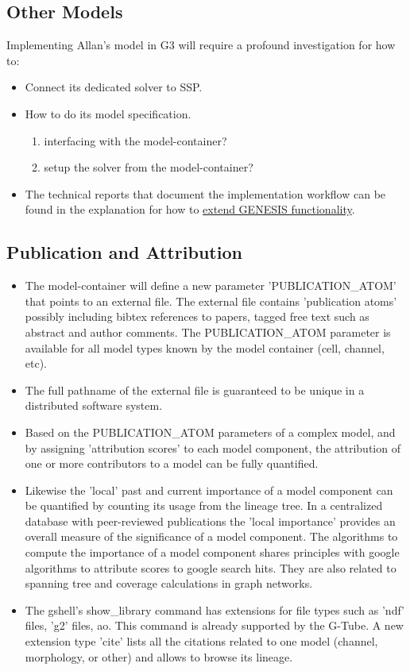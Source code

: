 \documentclass[12pt]{article}
\begin{document}
\subsection{Other Models}

Implementing Allan's model in G3 will require a profound investigation
for how to:
\begin{itemize}
\item Connect its dedicated solver to SSP.
\item How to do its model specification.
  \begin{enumerate}
  \item interfacing with the model-container?
  \item setup the solver from the model-container?
  \end{enumerate}
\item The technical reports that document the implementation workflow
  can be found in the explanation for how to
  \href{../genesis-extend-functionality/genesis-extend-functionality.tex}{extend
    GENESIS functionality}.
\end{itemize}


\subsection{Publication and Attribution}

\begin{itemize}
\item The model-container will define a new parameter
  'PUBLICATION\_ATOM' that points to an external file.  The external
  file contains 'publication atoms' possibly including bibtex
  references to papers, tagged free text such as abstract and author
  comments.  The PUBLICATION\_ATOM parameter is available for all
  model types known by the model container (cell, channel, etc).
\item The full pathname of the external file is guaranteed to be
  unique in a distributed software system.
\item Based on the PUBLICATION\_ATOM parameters of a complex model,
  and by assigning 'attribution scores' to each model component, the
  attribution of one or more contributors to a model can be fully
  quantified.
\item Likewise the 'local' past and current importance of a model
  component can be quantified by counting its usage from the lineage
  tree.  In a centralized database with peer-reviewed publications the
  'local importance' provides an overall measure of the significance
  of a model component.  The algorithms to compute the importance of a
  model component shares principles with google algorithms to
  attribute scores to google search hits.  They are also related to
  spanning tree and coverage calculations in graph networks.
\item The gshell's show\_library command has extensions for file types
  such as 'ndf' files, 'g2' files, ao.  This command is already
  supported by the G-Tube.  A new extension type 'cite' lists all the
  citations related to one model (channel, morphology, or other) and
  allows to browse its lineage.
\end{itemize}
\end{document}
